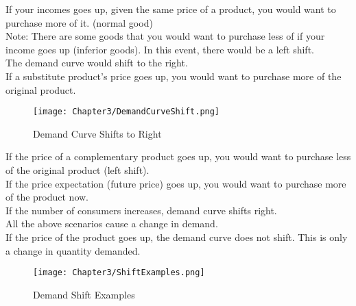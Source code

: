 \begin{example}
    If your incomes goes up, given the same price of a product, you would want to purchase more of it. (normal good)\\
    Note: There are some goods that you would want to purchase less of if your income goes up (inferior goods). In this event, there would be a left shift.\\
    The demand curve would shift to the right.\\ If a substitute product's price goes up, 
    you would want to purchase more of the original product.
    \begin{figure}[H]
        \centering
        \texttt{[image: Chapter3/DemandCurveShift.png]}
        \caption{Demand Curve Shifts to Right}
    \end{figure}
    If the price of a complementary product goes up, you would want to purchase less of the original product (left shift).\\
    If the price expectation (future price) goes up, you would want to purchase more of the product now.\\
    If the number of consumers increases, demand curve shifts right.\\
    All the above scenarios cause a change in demand.\\
    If the price of the product goes up, the demand curve does not shift. This is only a change in quantity demanded.
\end{example}
\begin{figure}[H]
    \centering
    \texttt{[image: Chapter3/ShiftExamples.png]}
    \caption{Demand Shift Examples}
\end{figure}